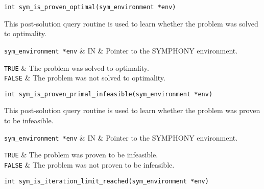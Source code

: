 \begin{verbatim}
int sym_is_proven_optimal(sym_environment *env)
\end{verbatim}

\bd
\describe

This post-solution query routine is used to learn whether the problem 
was solved to optimality.

\args

{\tt sym\_environment *env} & IN & Pointer to the SYMPHONY environment.
\et

\returns

{\tt TRUE} & The problem was solved to optimality. \\
{\tt FALSE} & The problem was not solved to optimality.\\
\et
\ed
\vspace{1ex}


\begin{verbatim}
int sym_is_proven_primal_infeasible(sym_environment *env)
\end{verbatim}

\bd
\describe

This post-solution query routine is used to learn whether the problem 
was proven to be infeasible.

\args

{\tt sym\_environment *env} & IN & Pointer to the SYMPHONY environment.
\et

\returns

{\tt TRUE} & The problem was proven to be infeasible. \\
{\tt FALSE} & The problem was not proven to be infeasible.\\
\et
\ed
\vspace{1ex}


\begin{verbatim}
int sym_is_iteration_limit_reached(sym_environment *env)
\end{verbatim}


